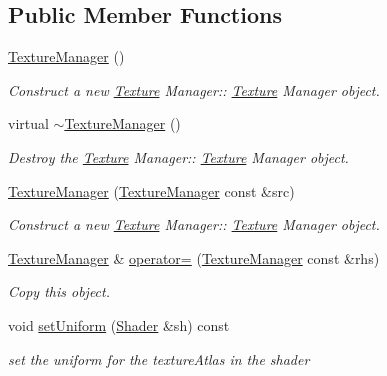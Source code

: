 \subsection*{Public Member Functions}
\begin{DoxyCompactItemize}
\item 
\mbox{\label{class_texture_manager_ad76abb178b37cedf4514eb0154349935}} 
\hyperlink{class_texture_manager_ad76abb178b37cedf4514eb0154349935}{Texture\+Manager} ()
\begin{DoxyCompactList}\small\item\em Construct a new \hyperlink{struct_texture}{Texture} Manager\+:\+: \hyperlink{struct_texture}{Texture} Manager object. \end{DoxyCompactList}\item 
\mbox{\label{class_texture_manager_a001d6d74674961db79987e3222682576}} 
virtual \hyperlink{class_texture_manager_a001d6d74674961db79987e3222682576}{$\sim$\+Texture\+Manager} ()
\begin{DoxyCompactList}\small\item\em Destroy the \hyperlink{struct_texture}{Texture} Manager\+:\+: \hyperlink{struct_texture}{Texture} Manager object. \end{DoxyCompactList}\item 
\hyperlink{class_texture_manager_a724699d0481a6623a1dce39f5b883b0b}{Texture\+Manager} (\hyperlink{class_texture_manager}{Texture\+Manager} const \&src)
\begin{DoxyCompactList}\small\item\em Construct a new \hyperlink{struct_texture}{Texture} Manager\+:\+: \hyperlink{struct_texture}{Texture} Manager object. \end{DoxyCompactList}\item 
\hyperlink{class_texture_manager}{Texture\+Manager} \& \hyperlink{class_texture_manager_a8ee4d36ef3526e464f51128ce3b6f96e}{operator=} (\hyperlink{class_texture_manager}{Texture\+Manager} const \&rhs)
\begin{DoxyCompactList}\small\item\em Copy this object. \end{DoxyCompactList}\item 
void \hyperlink{class_texture_manager_a91921404e41ac48ed95589877e0730d1}{set\+Uniform} (\hyperlink{class_shader}{Shader} \&sh) const
\begin{DoxyCompactList}\small\item\em set the uniform for the texture\+Atlas in the shader \end{DoxyCompactList}\item 

\end{DoxyCompactItemize}
